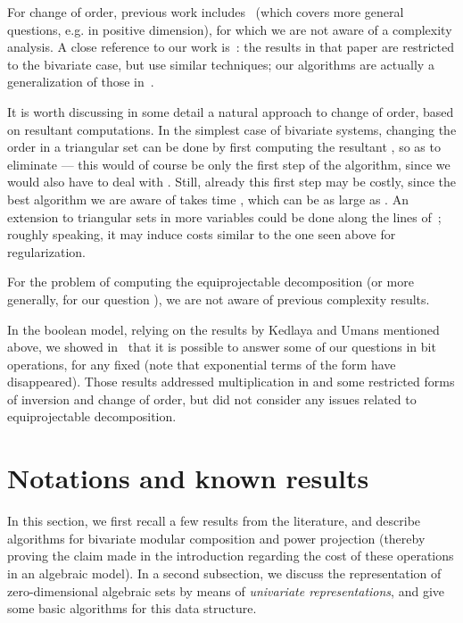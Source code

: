 \documentclass[12pt]{article}
\begin{document}
For change of order, previous work includes~\cite{BoLeMo01} (which
covers more general questions, e.g. in positive dimension), for which
we are not aware of a complexity analysis. A close reference to our
work is~\cite{PaSc06}: the results in that paper are restricted to the
bivariate case, but use similar techniques; our algorithms are
actually a generalization of those in~\cite{PaSc06}. 

It is worth discussing in some detail a natural approach to change of
order, based on resultant computations. In the simplest case of
bivariate systems, changing the order in a triangular set
 can be done by first computing the resultant
, so as to eliminate  --- this would of
course be only the first step of the algorithm, since we would also
have to deal with . Still, already this first step may be costly,
since the best algorithm we are aware of takes time
, which can be as large as
. An extension to triangular sets in more
variables could be done along the lines of~\cite{LiMoPa09,LiMoPa10};
roughly speaking, it may induce costs similar to the one seen above
for regularization.

For the problem of computing the equiprojectable decomposition (or
more generally, for our question ), we are not aware of
previous complexity results.

In the boolean model, relying on the results by Kedlaya and Umans
mentioned above, we showed in~\cite{PoSc10} that it is possible to
answer some of our questions in  bit operations, for any fixed
 (note that exponential terms of the form  have
disappeared).  Those results addressed multiplication in  and
some restricted forms of inversion and change of order, but did not
consider any issues related to equiprojectable decomposition.



\section{Notations and known results}\label{sec:notation}

In this section, we first recall a few results from the literature,
and describe algorithms for bivariate modular composition and power
projection (thereby proving the claim made in the introduction
regarding the cost of these operations in an algebraic model). In a
second subsection, we discuss the representation of zero-dimensional
algebraic sets by means of {\em univariate representations}, and give
some basic algorithms for this data structure.
\end{document}

